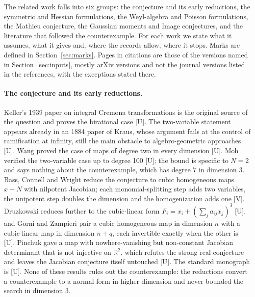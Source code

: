 \documentclass[11pt]{article}
\theoremstyle{remark}
\begin{document}
The related work falls into six groups: the conjecture and its early reductions, the symmetric and Hessian formulations, the Weyl-algebra and Poisson formulations, the Mathieu conjecture, the Gaussian moments and Image conjectures, and the literature that followed the counterexample. For each work we state what it assumes, what it gives and, where the records allow, where it stops. Marks are defined in Section~\ref{sec:marks}. Pages in citations are those of the versions named in Section~\ref{sec:inputs}, mostly arXiv versions and not the journal versions listed in the references, with the exceptions stated there.

\paragraph{The conjecture and its early reductions.} Keller's 1939 paper on integral Cremona transformations is the original source of the question and proves the birational case \cite{Keller1939} [U]. The two-variable statement appears already in an 1884 paper of Kraus, whose argument fails at the control of ramification at infinity, still the main obstacle to algebro-geometric approaches \cite{RodriguezDiaz2026} [U]. Wang proved the case of maps of degree two in every dimension \cite{Wang1980} [U]. Moh verified the two-variable case up to degree 100 \cite{Moh1983} [U]; the bound is specific to $N=2$ and says nothing about the counterexample, which has degree 7 in dimension 3. Bass, Connell and Wright reduce the conjecture to cubic homogeneous maps $x+N$ with nilpotent Jacobian; each monomial-splitting step adds two variables, the unipotent step doubles the dimension and the homogenization adds one \cite[Chapter~II, Theorem~(2.1) and Corollary~(2.2), p.~304; Proposition~(3.1), p.~305; Section~4 and Lemma~(4.1), pp.~306--307]{BCW1982} [V]. Druzkowski reduces further to the cubic-linear form $F_i=x_i+(\sum_ja_{ij}x_j)^3$ \cite{Druzkowski1983} [U], and Gorni and Zampieri pair a cubic homogeneous map in dimension $n$ with a cubic-linear map in dimension $n+q$, each invertible exactly when the other is \cite{GorniZampieri1997} [U]. Pinchuk gave a map with nowhere-vanishing but non-constant Jacobian determinant that is not injective on $\mathbb R^2$, which refutes the strong real conjecture and leaves the Jacobian conjecture itself untouched \cite{Pinchuk1994} [U]. The standard monograph is \cite{vdE2000} [U]. None of these results rules out the counterexample: the reductions convert a counterexample to a normal form in higher dimension and never bounded the search in dimension 3.
\end{document}
